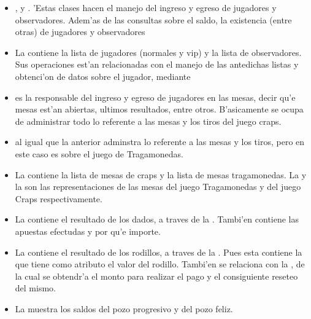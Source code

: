 \begin{itemize}
 \item {},  y . 'Estas clases hacen el manejo del ingreso y egreso de jugadores y observadores. Adem'as de las consultas sobre el saldo, la existencia (entre otras) de jugadores y observadores

\item La  contiene la lista de jugadores (normales y vip) y la lista de observadores.
Sus operaciones est'an relacionadas con el manejo de las antedichas listas y obtenci'on de datos sobre el jugador, mediante 

\item {} es la responsable del ingreso y egreso de jugadores en las mesas, decir qu'e mesas est'an abiertas, ultimos resultados, entre otros. B'asicamente se ocupa de administrar todo lo referente a las mesas y los tiros del juego craps.

\item {} al igual que la anterior adminstra lo referente a las mesas y los tiros, pero en este caso es sobre el juego de Tragamonedas.

\item La  contiene la lista de mesas de craps y la lista de mesas tragamonedas. La  y la  son las representaciones de las mesas del juego Tragamonedas y del juego Craps respectivamente. 

\item La  contiene el resultado de los dados, a traves de la . Tambi'en contiene las apuestas efectudas y por qu'e importe.

\item La  contiene el resultado de los rodillos, a traves de la . Pues esta contiene la  que tiene como atributo el valor del rodillo.
Tambi'en se relaciona con la , de la cual se obtendr'a el monto para realizar el pago y el consiguiente reseteo del mismo.

\item La  muestra los saldos del pozo progresivo y del pozo feliz.


\end{itemize}
